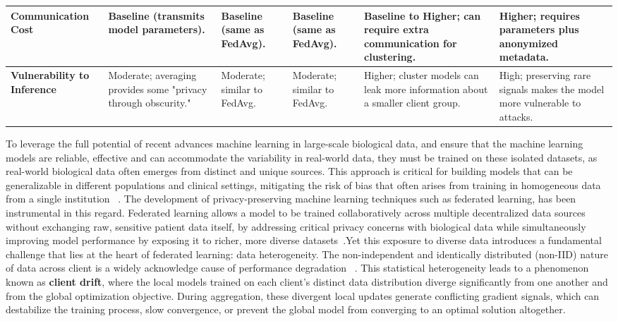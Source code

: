 \documentclass[conference]{IEEEtran}
\begin{document}
\begin{table}[!htbp]
\begin{tabular}{p{2.1cm} p{2.4cm} p{2.4cm} p{2.4cm} p{2.6cm} p{2.6cm}}
    \textbf{Communication Cost} & 
    Baseline (transmits model parameters). &
    Baseline (same as FedAvg). &
    Baseline (same as FedAvg). &
    Baseline to Higher; can require extra communication for clustering. &
    Higher; requires parameters plus anonymized metadata. \\
    \midrule

    \textbf{Vulnerability to Inference} & 
    Moderate; averaging provides some "privacy through obscurity." &
    Moderate; similar to FedAvg. &
    Moderate; similar to FedAvg. &
    Higher; cluster models can leak more information about a smaller client group. &
    High; preserving rare signals makes the model more vulnerable to attacks. \\
    
    \bottomrule
    \end{tabular}
\end{table}

To leverage the full potential of recent advances machine learning in large-scale biological data, and ensure that the machine learning models are reliable, effective and can accommodate the variability in real-world data, they must be trained on these isolated datasets, as real-world biological data often emerges from distinct and unique sources. This approach is critical for building models that can be generalizable in different populations and clinical settings, mitigating the risk of bias that often arises from training in homogeneous data from a single institution ~\cite{gaonkar2020ethical, cross2024bias, rockenschaub2024impact}. The development of privacy-preserving machine learning techniques such as federated learning, has been instrumental in this regard. Federated learning allows a model to be trained collaboratively across multiple decentralized data sources without exchanging raw, sensitive patient data itself, by addressing critical privacy concerns with biological data while simultaneously improving model performance by exposing it to richer, more diverse datasets~\cite{pmlr-v54-mcmahan17a, rieke2020future}.Yet this exposure to diverse data introduces a fundamental challenge that lies at the heart of federated learning: data heterogeneity. The non-independent and identically distributed (non-IID) nature of data across client is a widely acknowledge cause of performance degradation ~\cite{https://doi.org/10.48550/arxiv.1806.00582, li2022federated, hsu2020federated}. This statistical heterogeneity leads to a phenomenon known as \textbf{client drift}, where the local models trained on each client's distinct data distribution diverge significantly from one another and from the global optimization objective. During aggregation, these divergent local updates generate conflicting gradient signals, which can destabilize the training process, slow convergence, or prevent the global model from converging to an optimal solution altogether.
\end{document}
